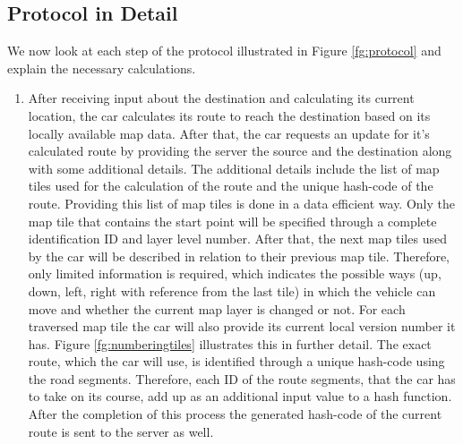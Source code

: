 \subsection{Protocol in Detail}
We now look at each step of the protocol illustrated in Figure \ref{fg:protocol} and explain the necessary calculations.
\begin{enumerate}
\item After receiving input about the destination and calculating its current location, the car calculates its route to reach the destination based on its locally available map data. After that, the car requests an update for it's calculated route by providing the server the source and the destination along with some additional details. The additional details include the list of map tiles used for the calculation of the route and the unique hash-code of the route. Providing this list of map tiles is done in a data efficient way. Only the map tile that contains the start point will be specified through a complete identification ID and layer level number. After that, the next map tiles used by the car will be described in relation to their previous map tile. Therefore, only limited information is required, which indicates the possible ways (up, down, left, right with reference from the last tile) in which the vehicle can move and whether the current map layer is changed or not. For each traversed map tile the car will also provide its current local version number it has. Figure \ref{fg:numberingtiles} illustrates this in further detail. The exact route, which the car will use, is identified through a unique hash-code using the road segments. Therefore, each ID of the route segments, that the car has to take on its course, add up as an additional input value to a hash function. After the completion of this process the generated hash-code of the current route is sent to the server as well.


\end{enumerate}
